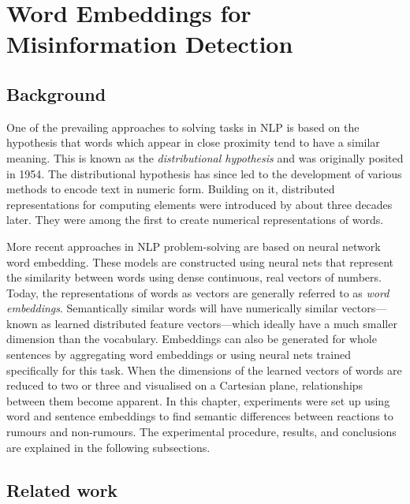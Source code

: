 \chapter{Word Embeddings for Misinformation Detection}\label{ch:word-embeddings}

\section{Background}
\label{sec:3-background}

One of the prevailing approaches to solving tasks in \ac{NLP} is based on the hypothesis that words which appear in close proximity tend to have a similar meaning. This is known as the \emph{distributional hypothesis} and was originally posited in 1954. The distributional hypothesis has since led to the development of various methods to encode text in numeric form. Building on it, distributed representations for computing elements were introduced by  about three decades later. They were among the first to create numerical representations of words.

More recent approaches in \ac{NLP} problem-solving are based on neural network word embedding. These models are constructed using neural nets that represent the similarity between words using dense continuous, real vectors of numbers. Today, the representations of words as vectors are generally referred to as \emph{word embeddings}. Semantically similar words will have numerically similar vectors—known as learned distributed feature vectors—which ideally have a much smaller dimension than the vocabulary. Embeddings can also be generated for whole sentences by aggregating word embeddings or using neural nets trained specifically for this task. When the dimensions of the learned vectors of words are reduced to two or three and visualised on a Cartesian plane, relationships between them become apparent. In this chapter, experiments were set up using word and sentence embeddings to find semantic differences between reactions to rumours and non-rumours. The experimental procedure, results, and conclusions are explained in the following subsections.

\section{Related work}
\label{sec:3-related-work}


